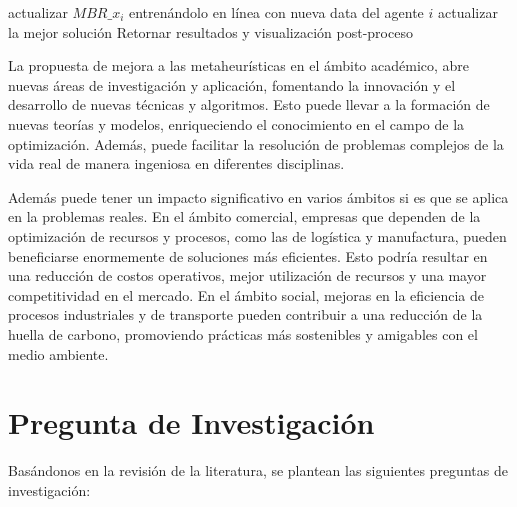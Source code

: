 \begin{algorithm}[!ht]
{{{{                    actualizar $MBR\_x_{i}$ entrenándolo en línea con nueva data del agente $i$\;
                }
            }
            actualizar la mejor solución \;
        }
    }
    Retornar resultados y visualización post-proceso\;
\end{algorithm}

La propuesta de mejora a las metaheurísticas en el ámbito académico, abre nuevas áreas de investigación y aplicación, fomentando la innovación y el desarrollo de nuevas técnicas y algoritmos. Esto puede llevar a la formación de nuevas teorías y modelos, enriqueciendo el conocimiento en el campo de la optimización. Además, puede facilitar la resolución de problemas complejos de la vida real de manera ingeniosa en diferentes disciplinas.

Además puede tener un impacto significativo en varios ámbitos si es que se aplica en la problemas reales. En el ámbito comercial, empresas que dependen de la optimización de recursos y procesos, como las de logística y manufactura, pueden beneficiarse enormemente de soluciones más eficientes. Esto podría resultar en una reducción de costos operativos, mejor utilización de recursos y una mayor competitividad en el mercado. En el ámbito social, mejoras en la eficiencia de procesos industriales y de transporte pueden contribuir a una reducción de la huella de carbono, promoviendo prácticas más sostenibles y amigables con el medio ambiente.







\section{Pregunta de Investigación}
\label{sc:PI}

Basándonos en la revisión de la literatura, se plantean las siguientes preguntas de investigación:


